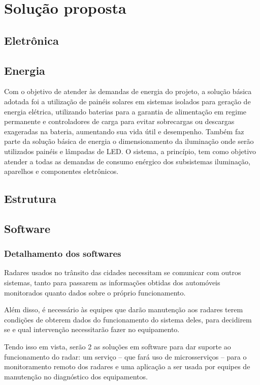 \chapter{Solução proposta}
\section{Eletrônica}
\section{Energia}

Com o objetivo de atender às demandas de energia do projeto, a solução básica adotada foi a utilização de painéis solares em sistemas isolados para geração de energia elétrica, utilizando baterias para a garantia de alimentação em regime permanente e controladores de carga para evitar sobrecargas ou descargas exageradas na bateria, aumentando sua vida útil e desempenho. Também faz parte da solução básica de energia o dimensionamento da iluminação onde serão utilizados painéis e lâmpadas de LED. O sistema, a princípio, tem como objetivo atender a todas as demandas de consumo enérgico dos subsistemas iluminação, aparelhos e componentes eletrônicos.

\section{Estrutura}
\section{Software}

\subsection{Detalhamento dos softwares}
Radares usados no trânsito das cidades necessitam se comunicar com outros sistemas, tanto para passarem as informações obtidas dos automóveis monitorados quanto dados sobre o próprio funcionamento.

Além disso, é necessário às equipes que darão manutenção aos radares terem condições de obterem dados do funcionamento do sistema deles, para decidirem se e qual intervenção necessitarão fazer no equipamento.

Tendo isso em vista, serão 2 as soluções em software para dar suporte ao funcionamento do radar: um serviço -- que fará uso de microsserviços -- para o monitoramento remoto dos radares e uma aplicação a ser usada por equipes de manutenção no diagnóstico dos equipamentos.

